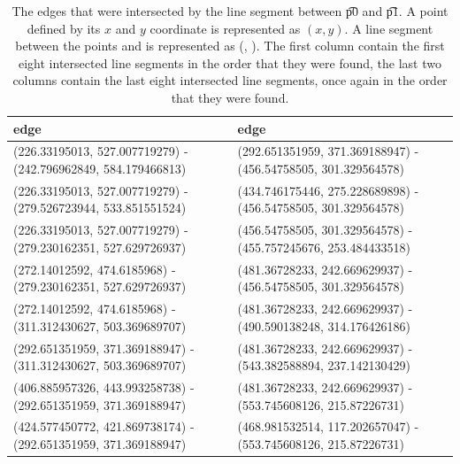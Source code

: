 \begin{table}
	\centering
	\footnotesize{
		\begin{tabular}{l|l}
		edge & edge\\
		\hline
		(\num{226.33195013}, 	\num{527.007719279}) - 	(\num{242.796962849}, 	\num{584.179466813}) & 		(\num{292.651351959},	\num{371.369188947}) - 	(\num{456.54758505}, 	\num{301.329564578})\\
		(\num{226.33195013}, 	\num{527.007719279}) - 	(\num{279.526723944}, 	\num{533.851551524}) & 		(\num{434.746175446},	\num{275.228689898}) - 	(\num{456.54758505}, 	\num{301.329564578})\\
		(\num{226.33195013}, 	\num{527.007719279}) - 	(\num{279.230162351}, 	\num{527.629726937}) & 		(\num{456.54758505}, 	\num{301.329564578}) - 	(\num{455.757245676}, 	\num{253.484433518})\\
		(\num{272.14012592}, 	\num{474.6185968}) - 	(\num{279.230162351}, 	\num{527.629726937}) & 		(\num{481.36728233}, 	\num{242.669629937}) - 	(\num{456.54758505}, 	\num{301.329564578})\\
		(\num{272.14012592}, 	\num{474.6185968}) - 	(\num{311.312430627}, 	\num{503.369689707}) & 		(\num{481.36728233}, 	\num{242.669629937}) - 	(\num{490.590138248}, 	\num{314.176426186})\\
		(\num{292.651351959},	\num{371.369188947}) - 	(\num{311.312430627}, 	\num{503.369689707}) & 		(\num{481.36728233}, 	\num{242.669629937}) - 	(\num{543.382588894}, 	\num{237.142130429})\\
		(\num{406.885957326},	\num{443.993258738}) - 	(\num{292.651351959}, 	\num{371.369188947}) & 		(\num{481.36728233}, 	\num{242.669629937}) - 	(\num{553.745608126}, 	\num{215.87226731})\\
		(\num{424.577450772},	\num{421.869738174}) - 	(\num{292.651351959}, 	\num{371.369188947}) & 		(\num{468.981532514},	\num{117.202657047}) - 	(\num{553.745608126}, 	\num{215.87226731})\\
		\end{tabular}
	}
	\caption{The edges that were intersected by the line segment between \t{p0} and \t{p1}. A point  defined by its $x$ and $y$ coordinate is represented as $(x, y)$. A line segment between the points  and  is represented as (, ). The first column contain the first eight intersected line segments in the order that they were found, the last two columns contain the last eight intersected line segments, once again in the order that they were found.}
	\label{tab:c:intersectedEdges2}
\end{table}





